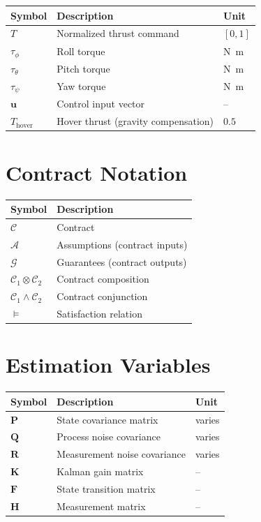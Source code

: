 \begin{longtable}{@{}p{3cm}p{8cm}p{3cm}@{}}
    \toprule
    \textbf{Symbol} & \textbf{Description} & \textbf{Unit} \\
    \midrule
    \endhead
    $T$ & Normalized thrust command & $[0, 1]$ \\
    $\tau_\phi$ & Roll torque & \si{\newton\meter} \\
    $\tau_\theta$ & Pitch torque & \si{\newton\meter} \\
    $\tau_\psi$ & Yaw torque & \si{\newton\meter} \\
    $\mathbf{u}$ & Control input vector & -- \\
    $T_{\text{hover}}$ & Hover thrust (gravity compensation) & $0.5$ \\
    \bottomrule
\end{longtable}

\section*{Contract Notation}

\begin{longtable}{@{}p{3cm}p{10cm}@{}}
    \toprule
    \textbf{Symbol} & \textbf{Description} \\
    \midrule
    \endhead
    $\mathcal{C}$ & Contract \\
    $\mathcal{A}$ & Assumptions (contract inputs) \\
    $\mathcal{G}$ & Guarantees (contract outputs) \\
    $\mathcal{C}_1 \otimes \mathcal{C}_2$ & Contract composition \\
    $\mathcal{C}_1 \wedge \mathcal{C}_2$ & Contract conjunction \\
    $\models$ & Satisfaction relation \\
    \bottomrule
\end{longtable}

\section*{Estimation Variables}

\begin{longtable}{@{}p{3cm}p{8cm}p{3cm}@{}}
    \toprule
    \textbf{Symbol} & \textbf{Description} & \textbf{Unit} \\
    \midrule
    \endhead
    $\mathbf{P}$ & State covariance matrix & varies \\
    $\mathbf{Q}$ & Process noise covariance & varies \\
    $\mathbf{R}$ & Measurement noise covariance & varies \\
    $\mathbf{K}$ & Kalman gain matrix & -- \\
    $\mathbf{F}$ & State transition matrix & -- \\
    $\mathbf{H}$ & Measurement matrix & -- \\
    \bottomrule
\end{longtable}

